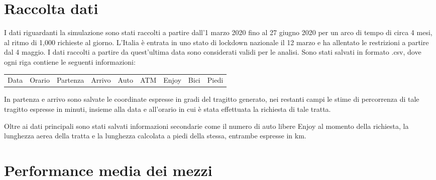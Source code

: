 \section{Raccolta dati}

I dati riguardanti la simulazione sono stati raccolti a partire dall'1 marzo 2020 fino al 27 giugno 2020 per un arco di tempo di circa 4 mesi, al ritmo di 1,000 richieste al giorno. L'Italia è entrata in uno stato di lockdown nazionale il 12 marzo e ha allentato le restrizioni a partire dal 4 maggio. I dati raccolti a partire da quest'ultima data sono considerati validi per le analisi. Sono stati salvati in formato .csv, dove ogni riga contiene le seguenti informazioni:

\begin{center}
	\begin{tabular}{ c c c c c c c c c  }
		Data & Orario & Partenza & Arrivo & Auto & ATM & Enjoy & Bici & Piedi
	\end{tabular}
\end{center}

In partenza e arrivo sono salvate le coordinate espresse in gradi del tragitto generato, nei restanti campi le stime di percorrenza di tale tragitto espresse in minuti, insieme alla data e all'orario in cui è stata effettuata la richiesta di tale tratta.

Oltre ai dati principali sono stati salvati informazioni secondarie come il numero di auto libere Enjoy al momento della richiesta, la lunghezza aerea della tratta e la lunghezza calcolata a piedi della stessa, entrambe espresse in km.

\section{Performance media dei mezzi}

